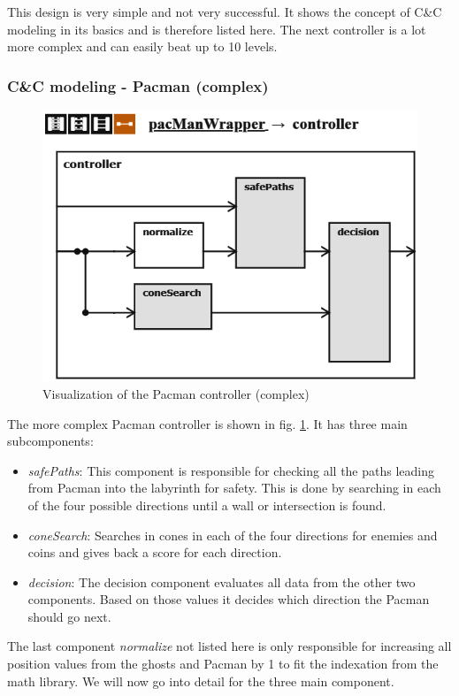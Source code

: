 This design is very simple and not very successful. It shows the concept of C\&C modeling in its basics and is therefore listed here. The next controller is a lot more complex and can easily beat up to 10 levels.

\subsubsection{C\&C modeling - Pacman (complex)}
\begin{figure}
	\label{fig:visPacman20}
	\centering
	\includegraphics[scale=0.85]{pictures/Pacman/Controller20.png}
	\caption{Visualization of the Pacman controller (complex)}
\end{figure}

The more complex Pacman controller is shown in fig. \ref{fig:visPacman20}.
It has three main subcomponents:
\begin{itemize}
	\item \textit{safePaths}: This component is responsible for checking all the paths leading from Pacman into the labyrinth for safety. This is done by searching in each of the four possible directions until a wall or intersection is found.	
	\item \textit{coneSearch}: Searches in cones in each of the four directions for enemies and coins and gives back a score for each direction.	
	\item \textit{decision}: The decision component evaluates all data from the other two components. Based on those values it decides which direction the Pacman should go next.	
\end{itemize}
The last component \textit{normalize} not listed here is only responsible for increasing all position values from the ghosts and Pacman by 1 to fit the indexation from the math library.
We will now go into detail for the three main component.
\newline

